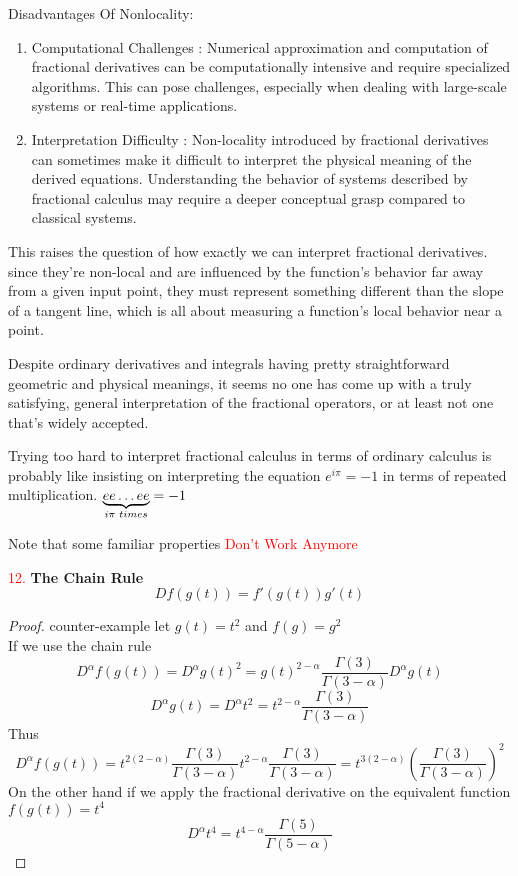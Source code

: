 Disadvantages Of Nonlocality:
\begin{enumerate}
    \item Computational Challenges : Numerical approximation and computation of fractional derivatives can be computationally intensive and require specialized algorithms. This can pose challenges, especially when dealing with large-scale systems or real-time applications.
    \item Interpretation Difficulty : Non-locality introduced by fractional derivatives can sometimes make it difficult to interpret the physical meaning of the derived equations. Understanding the behavior of systems described by fractional calculus may require a deeper conceptual grasp compared to classical systems.
\end{enumerate}

This raises the question of how exactly we can interpret fractional derivatives. 
since they're non-local and are influenced by the function's behavior far away 
from a given input point, they must represent something different 
than the slope of a tangent line, which is all about measuring a 
function's local behavior near a point.

Despite ordinary derivatives and integrals having pretty 
straightforward geometric and physical meanings, it seems no one 
has come up with a truly satisfying, general interpretation of 
the fractional operators, or at least not one that's widely 
accepted.

Trying too hard to interpret fractional calculus in 
terms of ordinary calculus is probably like insisting on 
interpreting the equation $\displaystyle e^{i\pi} = -1$ in terms 
of repeated multiplication. $\underbrace{ee \dots ee}_{i\pi \,\,  times} = -1$

Note that some familiar properties \textcolor{red}{Don't Work Anymore}

\textcolor{red}{12.}\textbf{ The Chain Rule}
\[
    D f(g(t)) = f'(g(t))g'(t)
\]
\begin{proof}[Proof]
    counter-example let $g(t) = t^2$ and $f(g)=g^2$ 
    \\
    If we use the chain rule
    \[
        D^\alpha f(g(t)) = D^\alpha g(t)^2 = g(t)^{2-\alpha}\frac{\Gamma{(3)} } {\Gamma{(3-\alpha)} }    D^\alpha g(t)
    \]  
    \[
        D^\alpha g(t) = D^\alpha t^2 = t^{2-\alpha}\frac{\Gamma{(3)} } {\Gamma{(3-\alpha)} }   
    \]
    Thus
    \[
        D^\alpha f(g(t)) = t^{2(2-\alpha)}\frac{\Gamma{(3)} } {\Gamma{(3-\alpha)} }    t^{2-\alpha}\frac{\Gamma{(3)} } {\Gamma{(3-\alpha)} }  = t^{3(2-\alpha)}\left(\frac{\Gamma{(3)} } {\Gamma{(3-\alpha)} } \right)^2
    \]
    On the other hand if we apply the fractional derivative on the equivalent function $f(g(t)) = t^4$
    \[
        D^\alpha t^4 = t^{4-\alpha}\frac{\Gamma{(5)} } {\Gamma{(5-\alpha)} }   
    \]  
\end{proof}

